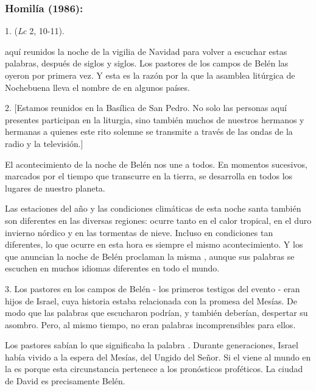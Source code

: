 \subsubsection{Homilía (1986):}


\begin{body}
	1.  (\emph{Lc} 2, 10-11).
	
	 aquí reunidos la noche de la vigilia de Navidad para volver a escuchar estas palabras, después de siglos y siglos. Los pastores de los campos de Belén las oyeron por primera vez. Y esta es la razón por la que la asamblea litúrgica de Nochebuena lleva el nombre de  en algunos países.
	
	2. {[}Estamos reunidos en la Basílica de San Pedro. No solo las personas aquí presentes participan en la liturgia, sino también muchos de nuestros hermanos y hermanas a quienes este rito solemne se transmite a través de las ondas de la radio y la televisión.{]}
	
	El acontecimiento de la noche de Belén nos une a todos. En momentos sucesivos, marcados por el tiempo que transcurre en la tierra, se desarrolla en todos los lugares de nuestro planeta.
	
	Las estaciones del año y las condiciones climáticas de esta noche santa también son diferentes en las diversas regiones: ocurre tanto en el calor tropical, en el duro invierno nórdico y en las tormentas de nieve. Incluso en condiciones tan diferentes, lo que ocurre en esta hora es siempre el mismo acontecimiento. Y los que anuncian la noche de Belén proclaman la misma , aunque sus palabras se escuchen en muchos idiomas diferentes en todo el mundo.
	
	3. Los pastores en los campos de Belén - los primeros testigos del evento - eran hijos de Israel, cuya historia estaba relacionada con la promesa del Mesías. De modo que las palabras que escucharon podrían, y también deberían, despertar su asombro. Pero, al mismo tiempo, no eran palabras incomprensibles para ellos.
	
	Los pastores sabían lo que significaba la palabra . Durante generaciones, Israel había vivido a la espera del Mesías, del Ungido del Señor. Si el  viene al mundo en la  es porque esta circunstancia pertenece a los pronósticos proféticos. La ciudad de David es precisamente Belén.
	

\end{body}
